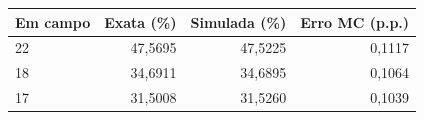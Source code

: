 \begin{tabular}{lrrr}
\toprule
Em campo & Exata (\%) & Simulada (\%) & Erro MC (p.p.) \\
\midrule
22 & 47,5695 & 47,5225 & 0,1117 \\
18 & 34,6911 & 34,6895 & 0,1064 \\
17 & 31,5008 & 31,5260 & 0,1039 \\
\bottomrule
\end{tabular}
